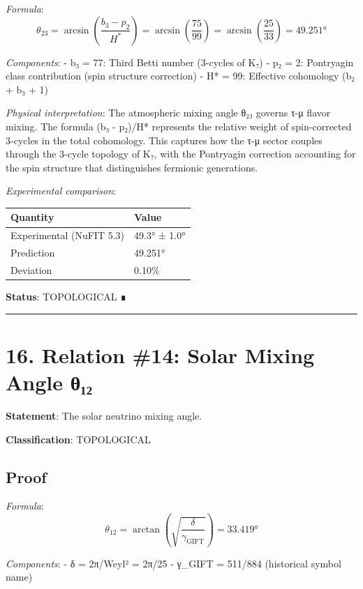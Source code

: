 \documentclass[11pt,a4paper]{article}
\begin{document}
\emph{Formula}: \[\theta_{23} = \arcsin\left(\frac{b_3 - p_2}{H^*}\right) = \arcsin\left(\frac{75}{99}\right) = \arcsin\left(\frac{25}{33}\right) = 49.251°\]

\emph{Components}: - b₃ = 77: Third Betti number (3-cycles of K₇) - p₂ = 2: Pontryagin class contribution (spin structure correction) - H* = 99: Effective cohomology (b₂ + b₃ + 1)

\emph{Physical interpretation}: The atmospheric mixing angle θ₂₃ governs τ-μ flavor mixing. The formula (b₃ - p₂)/H* represents the relative weight of spin-corrected 3-cycles in the total cohomology. This captures how the τ-μ sector couples through the 3-cycle topology of K₇, with the Pontryagin correction accounting for the spin structure that distinguishes fermionic generations.

\emph{Experimental comparison}:

\begin{longtable}[]{@{}ll@{}}
\toprule\noalign{}
Quantity & Value \\
\midrule\noalign{}
\endhead
\bottomrule\noalign{}
\endlastfoot
Experimental (NuFIT 5.3) & 49.3° ± 1.0° \\
Prediction & 49.251° \\
Deviation & 0.10\% \\
\end{longtable}

\textbf{Status}: TOPOLOGICAL ∎

\begin{center}\rule{\linewidth}{0.5pt}\end{center}

\section{16. Relation \#14: Solar Mixing Angle θ₁₂}\label{relation-14-solar-mixing-angle-ux3b8ux2081ux2082}

\textbf{Statement}: The solar neutrino mixing angle.

\textbf{Classification}: TOPOLOGICAL

\subsection{Proof}\label{proof-18}

\emph{Formula}: \[\theta_{12} = \arctan\left(\sqrt{\frac{\delta}{\gamma_{\text{GIFT}}}}\right) = 33.419°\]

\emph{Components}: - δ = 2π/Weyl² = 2π/25 - γ\_\allowbreak{}GIFT = 511/884 (historical symbol name)
\end{document}
